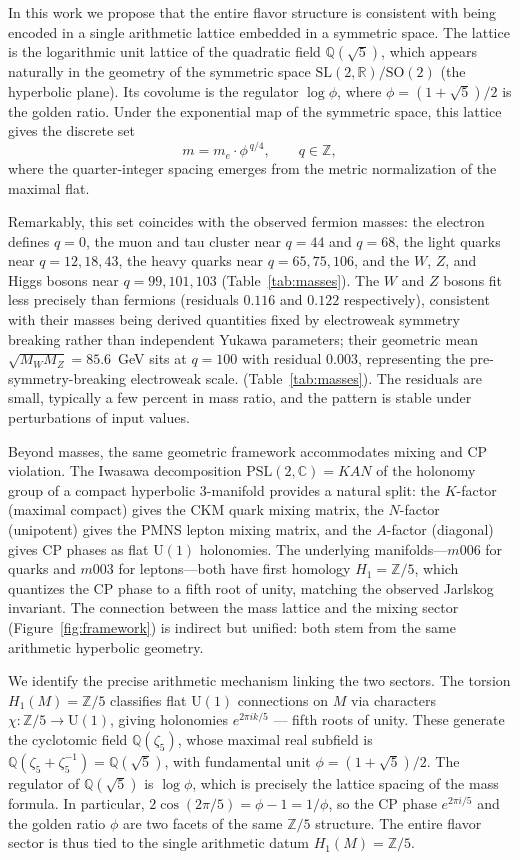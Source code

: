 ﻿\documentclass[12pt]{article}
\theoremstyle{definition}
\begin{document}
In this work we propose that the entire flavor structure is consistent with being encoded in a single arithmetic lattice embedded in a symmetric space. The lattice is the logarithmic unit lattice of the quadratic field $\mathbb{Q}(\sqrt5)$, which appears naturally in the geometry of the symmetric space $\mathrm{SL}(2,\mathbb{R})/\mathrm{SO}(2)$ (the hyperbolic plane). Its covolume is the regulator $\log\phi$, where $\phi = (1+\sqrt5)/2$ is the golden ratio. Under the exponential map of the symmetric space, this lattice gives the discrete set
\[
m = m_e \cdot \phi^{\,q/4},\qquad q\in\mathbb{Z},
\]
where the quarter-integer spacing emerges from the metric normalization of the maximal flat.

Remarkably, this set coincides with the observed fermion masses: the electron defines $q=0$, the muon and tau cluster near $q=44$ and $q=68$, the light quarks near $q=12,18,43$, the heavy quarks near $q=65,75,106$, and the $W$, $Z$, and Higgs bosons near $q=99,101,103$ (Table~\ref{tab:masses}). The $W$ and $Z$ bosons fit less precisely than fermions (residuals $0.116$ and $0.122$ respectively), consistent with their masses being derived quantities fixed by electroweak symmetry breaking rather than independent Yukawa parameters; their geometric mean $\sqrt{M_W M_Z} = 85.6$~GeV sits at $q = 100$ with residual $0.003$, representing the pre-symmetry-breaking electroweak scale. (Table~\ref{tab:masses}). The residuals are small, typically a few percent in mass ratio, and the pattern is stable under perturbations of input values.

Beyond masses, the same geometric framework accommodates mixing and CP violation. The Iwasawa decomposition $\mathrm{PSL}(2,\mathbb{C}) = KAN$ of the holonomy group of a compact hyperbolic 3-manifold provides a natural split: the $K$-factor (maximal compact) gives the CKM quark mixing matrix, the $N$-factor (unipotent) gives the PMNS lepton mixing matrix, and the $A$-factor (diagonal) gives CP phases as flat $\mathrm{U}(1)$ holonomies. The underlying manifolds---$m006$ for quarks and $m003$ for leptons---both have first homology $H_1 = \mathbb{Z}/5$, which quantizes the CP phase to a fifth root of unity, matching the observed Jarlskog invariant. The connection between the mass lattice and the mixing sector (Figure~\ref{fig:framework}) is indirect but unified: both stem from the same arithmetic hyperbolic geometry.

We identify the precise arithmetic mechanism linking the two sectors. The torsion $H_1(M)=\mathbb{Z}/5$ classifies flat $\mathrm{U}(1)$ connections on $M$ via characters $\chi: \mathbb{Z}/5 \to \mathrm{U}(1)$, giving holonomies $e^{2\pi i k/5}$ --- fifth roots of unity. These generate the cyclotomic field $\mathbb{Q}(\zeta_5)$, whose maximal real subfield is $\mathbb{Q}(\zeta_5 + \zeta_5^{-1}) = \mathbb{Q}(\sqrt{5})$, with fundamental unit $\phi = (1+\sqrt{5})/2$. The regulator of $\mathbb{Q}(\sqrt{5})$ is $\log\phi$, which is precisely the lattice spacing of the mass formula. In particular, $2\cos(2\pi/5) = \phi - 1 = 1/\phi$, so the CP phase $e^{2\pi i/5}$ and the golden ratio $\phi$ are two facets of the same $\mathbb{Z}/5$ structure. The entire flavor sector is thus tied to the single arithmetic datum $H_1(M) = \mathbb{Z}/5$.
\end{document}
